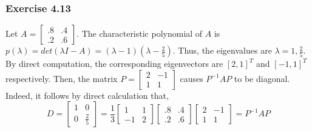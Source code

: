 \documentclass[letterpaper,12pt]{article}
\theoremstyle{definition}
\begin{document}
\subsubsection*{Exercise 4.13}
Let $A = \begin{bmatrix} .8 & .4 \\ .2 & .6 \end{bmatrix}$. The characteristic polynomial of $A$ is $p(\lambda) = det(\lambda I - A) = (\lambda - 1)(\lambda - \frac{2}{5})$. Thus, the eigenvalues are $\lambda = 1, \frac{2}{5}$. By direct computation, the corresponding eigenvectors are $[2,  1]^T$ and $[-1, 1]^T$ respectively. Then, the matrix  $P = \begin{bmatrix} 2 & -1 \\ 1 & 1 \end{bmatrix}$  causes $P^{-1}AP$ to be diagonal. Indeed, it follows by direct calculation that,
\begin{equation}
	D = \begin{bmatrix} 1 & 0 \\ 0 & \frac{2}{5} \end{bmatrix} 
	   = \frac{1}{3} \begin{bmatrix} 1 & 1 \\ -1 & 2 \end{bmatrix}
	      \begin{bmatrix} .8 & .4 \\ .2 & .6 \end{bmatrix}
	       \begin{bmatrix} 2 & -1 \\ 1 & 1 \end{bmatrix} = P^{-1} A P
\end{equation}
\end{document}
